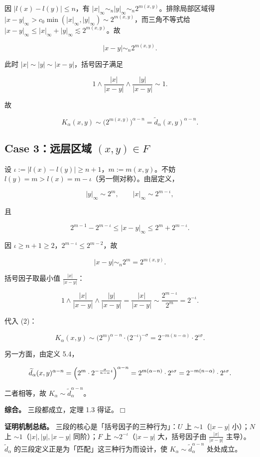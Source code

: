 \documentclass[a4paper,11pt,openany]{ctexbook}
\numberwithin{equation}{chapter}
\numberwithin{figure}{chapter}
\numberwithin{table}{chapter}
\begin{document}
因 $|l(x)-l(y)|\le n$，有 $|x|_\infty\sim_n|y|_\infty\sim_n2^{m(x,y)}$。排除局部区域得 $|x-y|_\infty>c_0\min(|x|_\infty,|y|_\infty)\sim2^{m(x,y)}$，而三角不等式给 $|x-y|_\infty\le|x|_\infty+|y|_\infty\lesssim2^{m(x,y)}$。故

$$|x-y|\sim_n2^{m(x,y)}.$$

此时 $|x|\sim|y|\sim|x-y|$，括号因子满足

$$1\wedge\frac{|x|}{|x-y|}\wedge\frac{|y|}{|x-y|}\sim1.$$

故

$$K_\alpha(x,y)\sim\bigl(2^{m(x,y)}\bigr)^{\alpha-n}=\widetilde d_\alpha(x,y)^{\alpha-n}.$$

\subsection{Case 3：远层区域 $(x,y)\in F$}

设 $\iota:=|l(x)-l(y)|\ge n+1$，$m:=m(x,y)$。不妨 $l(y)=m>l(x)=m-\iota$（另一侧对称）。由层定义，

$$|y|_\infty\sim2^m,\qquad |x|_\infty\sim2^{m-\iota},$$

且

$$2^{m-1}-2^{m-\iota}\le|x-y|_\infty\le2^m+2^{m-\iota}.$$

因 $\iota\ge n+1\ge2$，$2^{m-\iota}\le2^{m-2}$，故

$$|x-y|\sim_n2^m=2^{m(x,y)}.$$

括号因子取最小值 $\frac{|x|}{|x-y|}$：

$$1\wedge\frac{|x|}{|x-y|}\wedge\frac{|y|}{|x-y|}=\frac{|x|}{|x-y|}\sim\frac{2^{m-\iota}}{2^m}=2^{-\iota}.$$

代入 (2)：

$$K_\alpha(x,y)\sim\bigl(2^m\bigr)^{\alpha-n}\cdot\bigl(2^{-\iota}\bigr)^{-\sigma}=2^{-m(n-\alpha)}\cdot2^{\iota\sigma}.$$

另一方面，由定义 5.4，

$$\widetilde d_\alpha(x,y)^{\alpha-n}=\Bigl(2^m\cdot2^{-\frac{\sigma}{n-\alpha}\iota}\Bigr)^{\alpha-n}=2^{m(\alpha-n)}\cdot2^{\iota\sigma}=2^{-m(n-\alpha)}\cdot2^{\iota\sigma}.$$

二者相等，故 $K_\alpha\sim\widetilde d_\alpha^{\alpha-n}$。

\textbf{综合。} 三段都成立，定理 1.3 得证。$\Box$

\textbf{证明机制总结。} 三段的核心是「括号因子的三种行为」：$U$ 上 $\sim1$（$|x-y|$ 小）；$N$ 上 $\sim1$（$|x|,|y|,|x-y|$ 同阶）；$F$ 上 $\sim2^{-\iota}$（$|x-y|$ 大，括号因子由 $\frac{|x|}{|x-y|}$ 主导）。$\widetilde d_\alpha$ 的三段定义正是为「匹配」这三种行为而设计，使 $K_\alpha\sim\widetilde d_\alpha^{\alpha-n}$ 处处成立。
\end{document}
